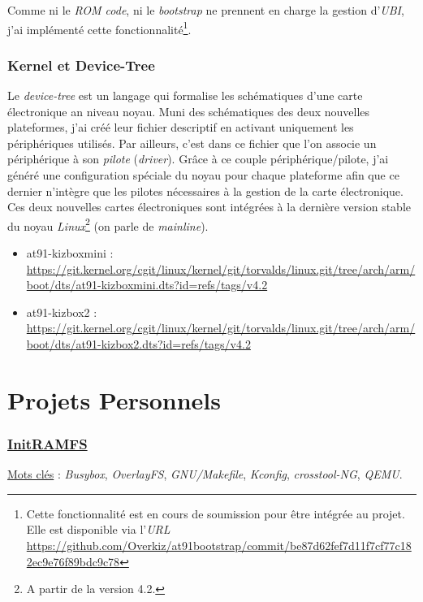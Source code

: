 \documentclass[a4paper]{article}
\begin{document}
Comme ni le \textit{ROM code}, ni le \textit{bootstrap} ne prennent en charge la gestion d'\textit{UBI}, j'ai implémenté cette fonctionnalité\footnote{Cette fonctionnalité est en cours de soumission pour être intégrée au projet. Elle est disponible via l'\textit{URL} \url{https://github.com/Overkiz/at91bootstrap/commit/be87d62fef7d11f7cf77c182ec9e76f89bdc9c78}}.

\section{Kernel et Device-Tree}

Le \textit{device-tree} est un langage qui formalise les schématiques d'une carte électronique an niveau noyau. Muni des schématiques des deux nouvelles plateformes, j'ai créé leur fichier descriptif en activant uniquement les périphériques utilisés. Par ailleurs, c'est dans ce fichier que l'on associe un périphérique à son \textit{pilote} (\textit{driver}). Grâce à ce couple périphérique/pilote, j'ai généré une configuration spéciale du noyau pour chaque plateforme afin que ce dernier n’intègre que les pilotes nécessaires à la gestion de la carte électronique.\\

Ces deux nouvelles cartes électroniques sont intégrées à la dernière version stable du noyau \textit{Linux}\footnote{A partir de la version 4.2.} (on parle de \textit{mainline}).
\begin{itemize}
\item at91-kizboxmini : \url{https://git.kernel.org/cgit/linux/kernel/git/torvalds/linux.git/tree/arch/arm/boot/dts/at91-kizboxmini.dts?id=refs/tags/v4.2}
\item at91-kizbox2 : \url{https://git.kernel.org/cgit/linux/kernel/git/torvalds/linux.git/tree/arch/arm/boot/dts/at91-kizbox2.dts?id=refs/tags/v4.2}
\end{itemize}
\clearpage

\part{Projets Personnels}

\section{\href{https://github.com/gazoo74/initramfs/}{InitRAMFS}}

\underline{Mots clés} : \textit{Busybox}, \textit{OverlayFS}, \textit{GNU/Makefile}, \textit{Kconfig}, \textit{crosstool-NG}, \textit{QEMU}.\\
\end{document}
